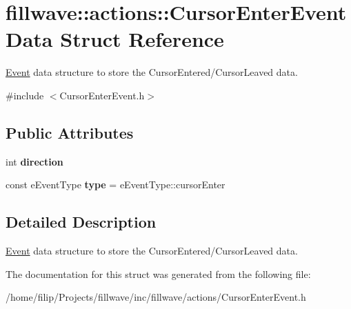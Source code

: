 \hypertarget{structfillwave_1_1actions_1_1CursorEnterEventData}{}\section{fillwave\+:\+:actions\+:\+:Cursor\+Enter\+Event\+Data Struct Reference}
\label{structfillwave_1_1actions_1_1CursorEnterEventData}


\hyperlink{classfillwave_1_1actions_1_1Event}{Event} data structure to store the Cursor\+Entered/\+Cursor\+Leaved data.  




{\ttfamily \#include $<$Cursor\+Enter\+Event.\+h$>$}

\subsection*{Public Attributes}
\begin{DoxyCompactItemize}
\item 
\hypertarget{structfillwave_1_1actions_1_1CursorEnterEventData_a524188b951d7bfb1b7a4d19a801d8f9f}{}int {\bfseries direction}\label{structfillwave_1_1actions_1_1CursorEnterEventData_a524188b951d7bfb1b7a4d19a801d8f9f}

\item 
\hypertarget{structfillwave_1_1actions_1_1CursorEnterEventData_a308768b426b03c0d2ae0b0293ad77edb}{}const e\+Event\+Type {\bfseries type} = e\+Event\+Type\+::cursor\+Enter\label{structfillwave_1_1actions_1_1CursorEnterEventData_a308768b426b03c0d2ae0b0293ad77edb}

\end{DoxyCompactItemize}


\subsection{Detailed Description}
\hyperlink{classfillwave_1_1actions_1_1Event}{Event} data structure to store the Cursor\+Entered/\+Cursor\+Leaved data. 

The documentation for this struct was generated from the following file\+:\begin{DoxyCompactItemize}
\item 
/home/filip/\+Projects/fillwave/inc/fillwave/actions/Cursor\+Enter\+Event.\+h\end{DoxyCompactItemize}
